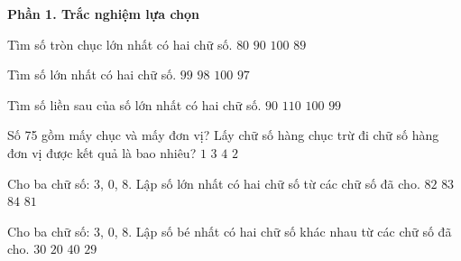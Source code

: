 \textbf{Phần 1. Trắc nghiệm lựa chọn}

\begin{ex} %
Tìm số tròn chục lớn nhất có hai chữ số.
\choice
{$80$}
{\True $90$}
{$100$}
{$89$}
\end{ex}

\begin{ex} %
Tìm số lớn nhất có hai chữ số.
\choice
{\True $99$}
{$98$}
{$100$}
{$97$}
\end{ex}

\begin{ex} %
Tìm số liền sau của số lớn nhất có hai chữ số.
\choice
{$90$}
{$110$}
{\True $100$}
{$99$}
\end{ex}

\begin{ex} %
Số 75 gồm mấy chục và mấy đơn vị? Lấy chữ số hàng chục trừ đi chữ số hàng đơn vị được kết quả là bao nhiêu?
\choice
{$1$}
{$3$}
{$4$}
{\True $2$}
\end{ex}

\begin{ex} %
Cho ba chữ số: 3, 0, 8. Lập số lớn nhất có hai chữ số từ các chữ số đã cho.
\choice
{$82$}
{\True $83$}
{$84$}
{$81$}
\end{ex}

\begin{ex} %
Cho ba chữ số: 3, 0, 8. Lập số bé nhất có hai chữ số khác nhau từ các chữ số đã cho.
\choice
{\True $30$}
{$20$}
{$40$}
{$29$}
\end{ex}

